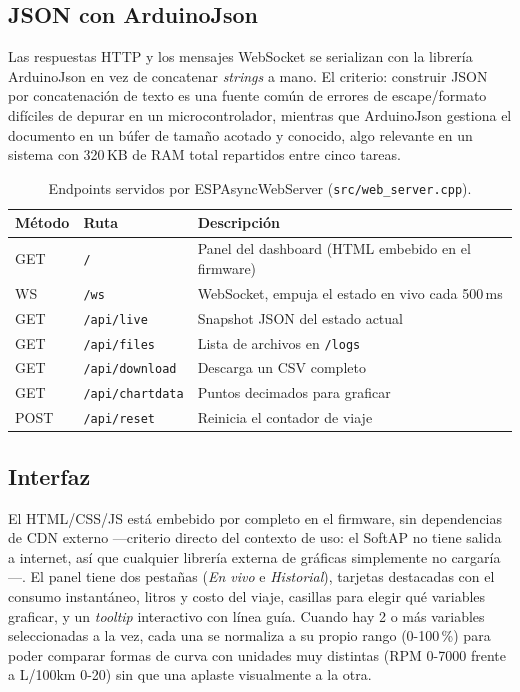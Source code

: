 \subsection{JSON con ArduinoJson}
Las respuestas HTTP y los mensajes WebSocket se serializan con la librería
ArduinoJson \cite{arduinojson2024} en vez de concatenar \textit{strings} a
mano. El criterio: construir JSON por concatenación de texto es una fuente
común de errores de escape/formato difíciles de depurar en un
microcontrolador, mientras que ArduinoJson gestiona el documento en un
búfer de tamaño acotado y conocido, algo relevante en un sistema con 320\,KB
de RAM total repartidos entre cinco tareas.

\begin{table}[H]
\centering
\caption{Endpoints servidos por ESPAsyncWebServer (\texttt{src/web\_server.cpp}).}
\begin{tabular}{@{}lll@{}}
\toprule
Método & Ruta & Descripción \\
\midrule
GET  & \texttt{/}              & Panel del dashboard (HTML embebido en el firmware) \\
WS   & \texttt{/ws}             & WebSocket, empuja el estado en vivo cada 500\,ms \\
GET  & \texttt{/api/live}       & Snapshot JSON del estado actual \\
GET  & \texttt{/api/files}      & Lista de archivos en \texttt{/logs} \\
GET  & \texttt{/api/download}   & Descarga un CSV completo \\
GET  & \texttt{/api/chartdata}  & Puntos decimados para graficar \\
POST & \texttt{/api/reset}      & Reinicia el contador de viaje \\
\bottomrule
\end{tabular}
\end{table}

\subsection{Interfaz}
El HTML/CSS/JS está embebido por completo en el firmware, sin dependencias
de CDN externo —criterio directo del contexto de uso: el SoftAP no tiene
salida a internet, así que cualquier librería externa de gráficas
simplemente no cargaría—. El panel tiene dos pestañas (\textit{En vivo} e
\textit{Historial}), tarjetas destacadas con el consumo instantáneo,
litros y costo del viaje, casillas para elegir qué variables graficar, y un
\textit{tooltip} interactivo con línea guía. Cuando hay 2 o más variables
seleccionadas a la vez, cada una se normaliza a su propio rango (0-100\,\%)
para poder comparar formas de curva con unidades muy distintas (RPM 0-7000
frente a L/100km 0-20) sin que una aplaste visualmente a la otra.


